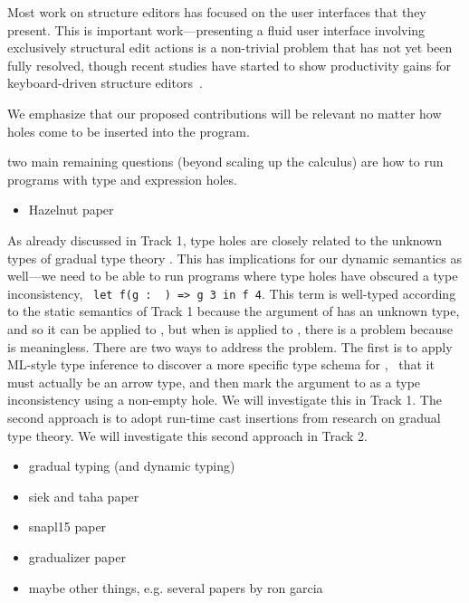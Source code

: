Most work on structure editors has focused on the user interfaces that they
present. This is important work---presenting a fluid user interface involving
exclusively structural edit actions is a non-trivial problem that has not yet
been fully resolved, though recent studies have started to show productivity
gains for keyboard-driven structure
editors~\cite{DBLP:conf/vl/Asenov014,DBLP:conf/sle/VolterSBK14}.

We emphasize
that our proposed contributions will be relevant no matter how holes come to be
inserted into the program. %

two main remaining questions (beyond scaling up the calculus) are how to run
programs with type and expression holes.

\begin{itemize}
	\item Hazelnut paper
\end{itemize}


As already discussed in Track 1, type holes are closely related to the unknown
types of gradual type theory \cite{Siek06a}. This has implications for our
dynamic semantics as well---we need to be able to run programs where type holes
have obscured a type inconsistency, \eg{}~\lstinline{let f(g : }\ \lstinline{) => g 3 in f 4}.
This term is well-typed according to the static semantics of Track 1 because the
argument  of  has an unknown type, and so it can be applied to
, but when  is applied to , there is a problem because 
is meaningless. There are two ways to address the problem. The first is to
apply ML-style type inference to discover a more specific type schema for
, \ie{}~that it must actually be an arrow type, and then mark the argument
 to  as a type inconsistency using a non-empty hole. We will
investigate this in Track 1. The second approach is to adopt run-time cast
insertions from research on gradual type theory. We will investigate this second
approach in Track 2. 

\begin{itemize}
	\item gradual typing (and dynamic typing)
  \item siek and taha paper
  \item snapl15 paper
  \item gradualizer paper
  \item maybe other things, e.g. several papers by ron garcia
\end{itemize}

